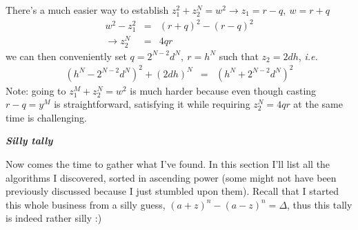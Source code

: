 \documentclass[aps,preprint,preprintnumbers,nofootinbib,showpacs,prd]{revtex4-1}
\newcommand{\ie}{{\it i.e.} }
\newcommand{\nbea}{\begin{eqnarray*}}
\newcommand{\neea}{\end{eqnarray*}}
\begin{document}
There's a much easier way to establish $z_1^2 + z_2^N = w^2 \longrightarrow z_1 = r-q, ~ w = r+q$
%
\nbea
w^2 - z_1^2 & = & (r+q)^2 - (r-q)^2 \\
\rightarrow z_2^N & = & 4qr
\neea
%
we can then conveniently set $q = 2^{N-2}d^N, ~r = h^N$ such that $z_2 = 2dh$, \ie
%
\nbea
(h^N - 2^{N-2}d^N)^2 + (2dh)^N & = & (h^N + 2^{N-2}d^N)^2
\neea
% 
Note: going to $z_1^M + z_2^N = w^2$ is much harder because even though casting $r-q = y^M$ is straightforward, satisfying it while requiring $z_2^N = 4qr$ at the same time is challenging.

\bigskip\textbf{\textit{Silly tally}}

Now comes the time to gather what I've found. In this section I'll list all the algorithms I discovered, sorted in ascending power (some might not have been previously discussed because I just stumbled upon them). Recall that I started this whole business from a silly guess, $ (a+z)^n - (a-z)^n = \Delta$, thus this tally is indeed rather silly :)
\end{document}
